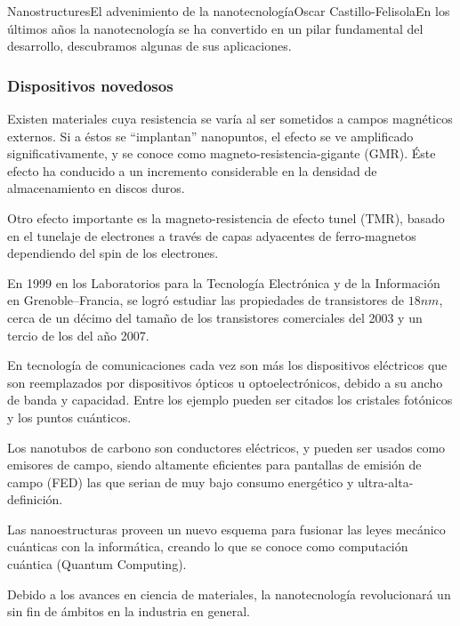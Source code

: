 \begin{article}{Nanostructures}{El advenimiento de la nanotecnolog\'ia}{Oscar Castillo-Felisola}{En los \'ultimos a\~nos la nanotecnolog\'ia se ha convertido en un pilar fundamental del desarrollo, descubramos algunas de sus aplicaciones.}
\subsubsection*{Dispositivos novedosos}

Existen materiales cuya resistencia se var\'ia  al ser sometidos a campos magn\'eticos externos. Si a \'estos se ``implantan'' nanopuntos, el efecto se ve amplificado significativamente, y se conoce como magneto-resistencia-gigante (GMR). \'Este efecto ha conducido a un incremento considerable en la densidad de almacenamiento en discos duros.

Otro efecto importante es la magneto-resistencia de efecto tunel (TMR), basado en el tunelaje de electrones a trav\'es de capas adyacentes  de ferro-magnetos dependiendo del spin de los electrones.

En 1999 en los Laboratorios para la Tecnolog\'ia Electr\'onica y de la Informaci\'on en Grenoble--Francia, se logr\'o estudiar las propiedades de transistores de $18 nm$, cerca de un d\'ecimo del tama\~no de los transistores comerciales del 2003 y un tercio de los del a\~no 2007.

En tecnolog\'ia de comunicaciones cada vez son m\'as los dispositivos el\'ectricos que son reemplazados por dispositivos \'opticos u optoelectr\'onicos, debido a su ancho de banda y capacidad. Entre los ejemplo pueden ser citados los cristales fot\'onicos y los puntos cu\'anticos.

Los nanotubos de carbono son conductores el\'ectricos, y pueden ser usados como emisores de campo,%
 siendo altamente eficientes para pantallas de emisi\'on de campo (FED) las que serian de muy bajo consumo energ\'etico y ultra-alta-definici\'on.

Las nanoestructuras proveen un nuevo esquema para fusionar las leyes mec\'anico cu\'anticas con la inform\'atica, creando lo que se conoce como computaci\'on cu\'antica (Quantum Computing).



Debido a los avances en ciencia de materiales, la nanotecnolog\'ia revolucionar\'a un sin fin de \'ambitos en la industria en general.


\end{article}
